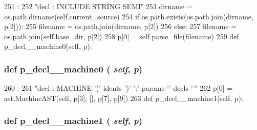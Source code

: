 \begin{DoxyCode}
251                                 :
252         "decl : INCLUDE STRING SEMI"
253         dirname = os.path.dirname(self.current_source)
254         if os.path.exists(os.path.join(dirname, p[2])):
255             filename = os.path.join(dirname, p[2])
256         else:
257             filename = os.path.join(self.base_dir, p[2])
258         p[0] = self.parse_file(filename)
259 
    def p_decl__machine0(self, p):
\end{DoxyCode}
\hypertarget{classslicc_1_1parser_1_1SLICC_a25638263d46d4eeeacf9388e26febc2d}{
\subsubsection[{p\_\-decl\_\-\_\-machine0}]{\setlength{\rightskip}{0pt plus 5cm}def p\_\-decl\_\-\_\-machine0 ( {\em self}, \/   {\em p})}}
\label{classslicc_1_1parser_1_1SLICC_a25638263d46d4eeeacf9388e26febc2d}



\begin{DoxyCode}
260                                  :
261         "decl : MACHINE '(' idents ')' ':' params '{' decls '}'"
262         p[0] = ast.MachineAST(self, p[3], [], p[7], p[9])
263 
    def p_decl__machine1(self, p):
\end{DoxyCode}
\hypertarget{classslicc_1_1parser_1_1SLICC_aa83eb0de63a42496932ce95f5d060f09}{
\subsubsection[{p\_\-decl\_\-\_\-machine1}]{\setlength{\rightskip}{0pt plus 5cm}def p\_\-decl\_\-\_\-machine1 ( {\em self}, \/   {\em p})}}
\label{classslicc_1_1parser_1_1SLICC_aa83eb0de63a42496932ce95f5d060f09}



